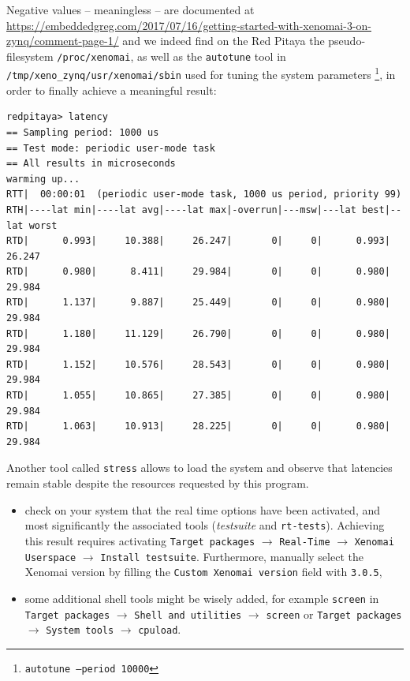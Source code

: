 \documentclass{article}
\begin{document}
{{Negative values -- meaningless -- are documented at \\
\url{https://embeddedgreg.com/2017/07/16/getting-started-with-xenomai-3-on-zynq/comment-page-1/} 
and we indeed find on the Red Pitaya the pseudo-filesystem {\tt /proc/xenomai}, as well as the
{\tt autotune} tool in \\{\tt /tmp/xeno\_zynq/usr/xenomai/sbin} used for tuning the system
parameters \footnote{{\tt autotune --period 10000}}, in order to finally achieve a meaningful
result:
\begin{verbatim}
redpitaya> latency 
== Sampling period: 1000 us
== Test mode: periodic user-mode task
== All results in microseconds
warming up...
RTT|  00:00:01  (periodic user-mode task, 1000 us period, priority 99)
RTH|----lat min|----lat avg|----lat max|-overrun|---msw|---lat best|--lat worst
RTD|      0.993|     10.388|     26.247|       0|     0|      0.993|     26.247
RTD|      0.980|      8.411|     29.984|       0|     0|      0.980|     29.984
RTD|      1.137|      9.887|     25.449|       0|     0|      0.980|     29.984
RTD|      1.180|     11.129|     26.790|       0|     0|      0.980|     29.984
RTD|      1.152|     10.576|     28.543|       0|     0|      0.980|     29.984
RTD|      1.055|     10.865|     27.385|       0|     0|      0.980|     29.984
RTD|      1.063|     10.913|     28.225|       0|     0|      0.980|     29.984
\end{verbatim}

Another tool called {\tt stress} allows to load the system and observe that latencies remain
stable despite the resources requested by this program.

%

\begin{itemize}
\item check on your system that the real time options have been activated, and most significantly
the associated tools ({\em testsuite} and {\tt rt-tests}). Achieving this result requires
activating {\tt Target packages} $\rightarrow$ {\tt Real-Time} $\rightarrow$ {\tt Xenomai Userspace} 
$\rightarrow$ {\tt Install testsuite}. Furthermore, manually select the Xenomai version by filling
the {\tt Custom Xenomai version} field with {\tt 3.0.5},
\item some additional shell tools might be wisely added, for example {\tt screen} in {\tt Target 
packages} $\rightarrow$ {\tt Shell and utilities} $\rightarrow$ {\tt screen} or {\tt Target 
packages} $\rightarrow$ {\tt System tools} $\rightarrow$ {\tt cpuload}. 
\end{itemize}

}}
\end{document}
